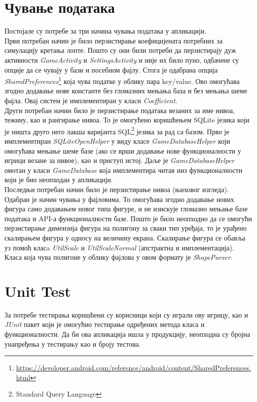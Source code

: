 \section{Чување података}
Постојале су потребе за три начина чувања података у апликацији. 
\\ \indent 
Први потребан начин је било перзистирање коефицијената потребних за симулацију кретања лопте. Пошто су они били потребн да перзистирају дуж активности \emph{GameActivity} и \emph{SettingsActivity} и није их било пуно, одбачене су опције да се чувају у бази и посебном фајлу. Стога је одабрана опција \emph{SharedPreferences}\footnote{\url{https://developer.android.com/reference/android/content/SharedPreferences.html}} која чува податке у облику пара key/value. Ово омогућава згодно додавање нове константе без гломазних мењања база и без мењања шеме фајла. Овај систем је имплементиран у класи \emph{Coefficient}.
\\ \indent 
Други потребан начин било је перзистирање података везаних за име нивоа, тежину, као и рангирање нивоа. То је омогућено коришћењем SQLite језика који је ништа друго него лакша варијанта SQL\footnote{Standard Query Language} језика за рад са базом. Прво је имплементиран \emph{SQLiteOpenHelper} у виду класе \emph{GameDatabaseHelper} који омогућава мењање шеме базе (ако се врши додавање нове функционалности у игрици везане за нивое), као и приступ истој. Даље је \emph{GameDatabaseHelper} омотан у класи \emph{GameDatabase} која имплементира читав низ функционалности који је био неопходан у апликацији. 
\\ \indent 
Последњи потребан начин било је перзистирање нивоа (њиховог изгледа). Одабран је начин чувања у фајловима. То омогућава згодно додавање нових фигура само додавањем новог типа фигуре, и не изискује гломазно мењање базе података и API-а функционалности базе. Пошто је било неопходно да се омогући перзистирање димензија фигура на полигону за сваки тип уређаја, то је урађено скалирањем фигура у односу на величину екрана. Скалирање фигура се обавља уз помоћ класa \emph{UtilScale} и \emph{UtilScaleNormal} (апстрактна и имплементација). Класа која чува полигоне у облику фајлова у овом формату је \emph{ShapeParser}. 

\section{Unit Test}
За потребе тестирања коришћени су корисници који су играли ову игрицу, као и \emph{JUnit} пакет који је омогућио тестирање одређених метода класа и функционалности. Да би ова апликација ишла у продукцију, неопходна су бројна унапређења у тестирању као и броју тестова.